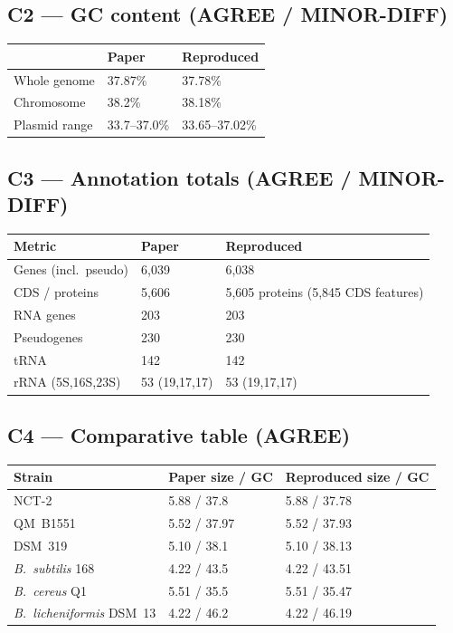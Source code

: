 \documentclass[11pt]{article}
\begin{document}
\subsection*{C2 --- GC content (AGREE / MINOR-DIFF)}
\begin{tabular}{@{}lll@{}}
\toprule
 & Paper & Reproduced \\
\midrule
Whole genome & 37.87\% & 37.78\% \\
Chromosome & 38.2\% & 38.18\% \\
Plasmid range & 33.7--37.0\% & 33.65--37.02\% \\
\bottomrule
\end{tabular}

\subsection*{C3 --- Annotation totals (AGREE / MINOR-DIFF)}
\begin{tabular}{@{}lll@{}}
\toprule
Metric & Paper & Reproduced \\
\midrule
Genes (incl.~pseudo) & 6{,}039 & 6{,}038 \\
CDS / proteins & 5{,}606 & 5{,}605 proteins (5{,}845 CDS features) \\
RNA genes & 203 & 203 \\
Pseudogenes & 230 & 230 \\
tRNA & 142 & 142 \\
rRNA (5S,16S,23S) & 53 (19,17,17) & 53 (19,17,17) \\
\bottomrule
\end{tabular}

\subsection*{C4 --- Comparative table (AGREE)}
\begin{tabular}{@{}lll@{}}
\toprule
Strain & Paper size / GC & Reproduced size / GC \\
\midrule
NCT-2 & 5.88 / 37.8 & 5.88 / 37.78 \\
QM~B1551 & 5.52 / 37.97 & 5.52 / 37.93 \\
DSM~319 & 5.10 / 38.1 & 5.10 / 38.13 \\
\emph{B.~subtilis} 168 & 4.22 / 43.5 & 4.22 / 43.51 \\
\emph{B.~cereus} Q1 & 5.51 / 35.5 & 5.51 / 35.47 \\
\emph{B.~licheniformis} DSM~13 & 4.22 / 46.2 & 4.22 / 46.19 \\
\bottomrule
\end{tabular}
\end{document}
